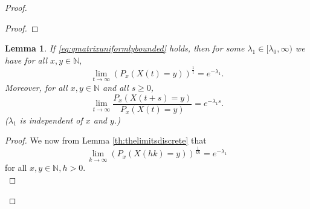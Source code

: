 \documentclass[12pt,a4paper]{scrartcl}
\newtheorem{lemma}[theorem]{Lemma}
\numberwithin{equation}{section}
\newcommand{\N}{\mathbb{N}} %
\begin{document}
\begin{proof}
\begin{proof}
\end{proof}


\begin{lemma}
If \eqref{eq:qmatrixuniformlybounded} holds, then for some $\lambda_1 \in [\lambda_0, \infty)$ we have for all $x,y \in \N,$
\begin{equation} \label{firstlimitlemma}
\lim_{t \to \infty}\left(P_x\left(X\left(t\right)=y\right)\right)^{\frac{1}{t}} = e^{-\lambda_1}.
\end{equation}
Moreover, for all $x,y \in \N$ and all $s \geq 0$,
\begin{equation} \label{secondlimitlemma}
\lim_{t \to \infty} \frac{P_x\left(X\left(t+s\right)=y\right)}{P_x\left(X\left(t\right)=y\right)} = e^{-\lambda_1 s}.
\end{equation}
($\lambda_1$ is independent of $x$ and $y$.)
\end{lemma}
\begin{proof}
We now from Lemma \ref{th:thelimitsdiscrete} that
\begin{equation} \label{seeverejones}
\lim_{k \to \infty} \left(P_x\left(X\left(hk\right)=y\right) \right)^{\frac{1}{kh}} = e^{-\lambda_1}
\end{equation}
for all $x,y \in \N, h > 0.$ \\[2ex]


\end{proof}
\end{proof}
\end{document}

